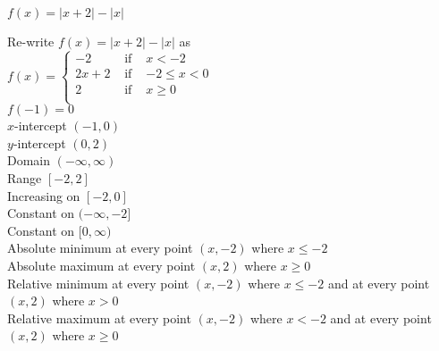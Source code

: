 {$f(x) = |x+2|-|x|$}
{Re-write $f(x) = |x+2|-|x|$ as \\ ${\displaystyle f(x) = \left\{ \begin{array}{rcl}
-2 & \mbox{ if } & x < -2\\
     2x+2 & \mbox{ if } & -2 \leq x < 0 \\ 
    2 & \mbox{ if } & x \geq 0 \\ \end{array} \right. }$ \\ $f\left(-1\right) = 0$ \\ $x$-intercept $\left(-1, 0\right)$ \\ $y$-intercept $(0,2)$ \\ Domain $(-\infty, \infty)$ \\ Range $[-2,2]$ \\ Increasing on $[-2,0]$ \\ Constant on $(-\infty, -2]$ \\ Constant on $[0,\infty)$ \\ Absolute minimum at every point $(x,-2)$ where $x \leq -2$ \\ Absolute maximum at every point $(x,2)$ where $x \geq 0$ \\ Relative minimum at every point $(x, -2)$ where $x \leq -2$ and at every point $(x,2)$ where $x>0$ \\ Relative maximum at every point $(x, -2)$ where $x < -2$ and at every point $(x,2)$ where $x \geq 0$ 

\begin{center}
\end{center}}